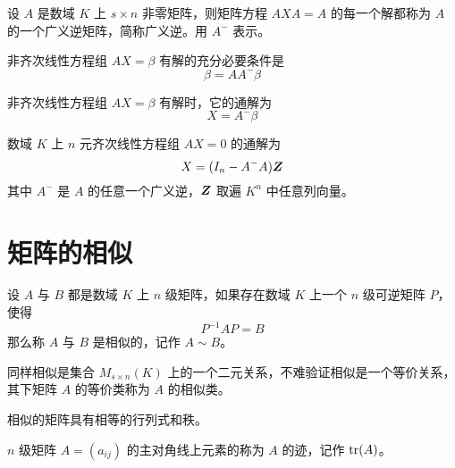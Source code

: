 \begin{definition}
	设 $A$ 是数域 $K$ 上 $s\times n$ 非零矩阵，则矩阵方程 $AXA = A$ 的每一个解都称为 $A$ 的一个广义逆矩阵，简称广义逆。用 $A^-$ 表示。
\end{definition}

\begin{theorem}
	非齐次线性方程组 $AX = \beta$ 有解的充分必要条件是
	\[\beta = AA^-\beta\]
\end{theorem}

\begin{theorem}
	非齐次线性方程组 $AX = \beta$ 有解时，它的通解为
	\[X  = A^-\beta\]
\end{theorem}

\begin{theorem}
	数域 $K$ 上 $n$ 元齐次线性方程组 $AX = 0$ 的通解为
	\[X  = (I_n - A^-A)\boldsymbol{Z}\]
	其中 $A^-$ 是 $A$ 的任意一个广义逆，$\boldsymbol{Z}$ 取遍 $K^n$ 中任意列向量。
\end{theorem}


\section{矩阵的相似}

\begin{definition}
	设 $A$ 与 $B$ 都是数域 $K$ 上 $n$ 级矩阵，如果存在数域 $K$ 上一个 $n$ 级可逆矩阵 $P$，使得
	\[P^{-1}AP = B\]
	那么称 $A$ 与 $B$ 是相似的，记作 $A\sim B$。
\end{definition}

同样相似是集合 $M_{s\times n}(K)$ 上的一个二元关系，不难验证相似是一个等价关系，其下矩阵 $A$ 的等价类称为 $A$ 的相似类。

相似的矩阵具有相等的行列式和秩。

\begin{definition}
	$n$ 级矩阵 $A=(a_{ij})$ 的主对角线上元素的称为 $A$ 的迹，记作 $\operatorname{tr}(A)$。
\end{definition}

